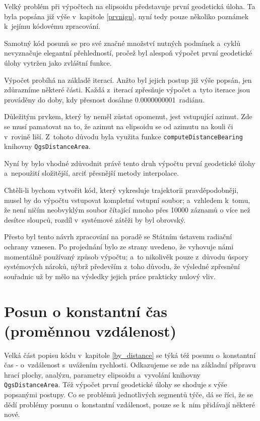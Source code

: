 Velký problém při výpočtech na elipsoidu představuje první geodetická úloha. Ta byla popsána
již výše v~kapitole \ref{prvnigu}, nyní tedy pouze několiko poznámek k~jejímu kódovému zpracování. 

Samotný kód posunů se pro své značné množství nutných podmínek a~cyklů nevyznačuje
elegantní přehledností, pročež byl alespoň výpočet první geodetické úlohy vytržen jako zvláštní funkce.

Výpočet probíhá na základě iterací. Anžto byl jejich postup již výše popsán, jen zdůrazníme
některé části. Každá z~iterací zpřesňuje výpočet a~tyto iterace jsou prováděny do doby,
kdy přesnost dosáhne 0.0000000001~radiánu. 

Důležitým prvkem, který by neměl zůstat opomenut, jest vstupující azimut. Zde se musí pamatovat
na to, že azimut na elipsoidu se od azimutu na kouli či v~ro\-vině liší. Z~tohoto
důvodu byla využita funkce {\tt computeDistanceBearing} knihovny {\tt QgsDistanceArea}.

Nyní by bylo vhodné zdůvodnit právě tento druh výpočtu první geodetické úlohy a~nepoužití
složitější, arciť přesnější metody interpolace. 

Chtěli-li bychom vytvořit kód, který vykresluje trajektorii pravděpodobněji, mu\-sel by do
výpočtu vstupovat kompletní vstupní soubor; a~vzhledem k~tomu, že není ničím neobvyklým
soubor čítající mnoho přes 10000 záznamů o více než desítce sloupců, rozdíl v~systémové zátěži
by byl obrovský. 

Přesto byl tento návrh zpraco\-vá\-ní na poradě se Státním ústavem radiační ochra\-ny
vznesen. Po projednání bylo ze strany  uvedeno, že vyhovuje námi momentálně
používaný způsob výpočtu; a~to nikolivěk pouze z~důvodu úspory systémových nároků, nýbrž především
z~toho důvodu, že výsledné zpřesnění souřadnic už by mělo na výsledky jejich práce
prakticky nulový vliv. 

\section{Posun o konstantní čas (proměnnou vzdálenost)}
\label{by_seconds}

Velká část popisu kódu v~kapitole \ref{by_distance} se týká též posunu o~konstantní
čas - o~vzdále\-nost s~uvážením rychlosti. Odkazujeme se zde na základní přípravu hrací plochy,
analýzu, parametry elipsoidu a~vyvolání knihovny {\tt QgsDistanceArea}. Též výpočet první geodetické
úlohy se shoduje s výše popsanými postupy. Co se problémů jednotlivých
segmentů týče, dá se říci, že se dědí problémy posunu o~konstantní vzdálenost, pouze se k~nim
přidávají některé nové. 

